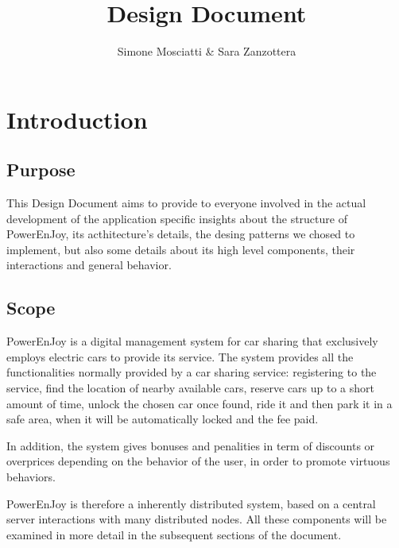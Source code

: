 \documentclass[11pt]{article} %
\title{Design Document}
\author{Simone Mosciatti \& Sara Zanzottera}
\newcommand{\pe}{PowerEnJoy }
\newcommand{\pecomma}{PowerEnJoy, }
\begin{document}
\maketitle
\newpage
\tableofcontents
\newpage


\section{Introduction}

\subsection{Purpose}

This Design Document aims to provide to everyone involved in the actual development of the application specific insights about the structure of \pecomma its acthitecture's details, the desing patterns we chosed to implement, but also some details about its high level components, their interactions and general behavior.

\subsection{Scope}

\pe is a digital management system for car sharing that exclusively employs electric cars to provide its service. The system provides all the functionalities normally provided by a car sharing service: registering to the service, find the location of nearby available cars, reserve cars up to a short amount of time, unlock the chosen car once found, ride it and then park it in a safe area, when it will be automatically locked and the fee paid.

In addition, the system gives bonuses and penalities in term of discounts or overprices depending on the behavior of the user, in order to promote virtuous behaviors.

\pe is therefore a inherently distributed system, based on a central server interactions with many distributed nodes. All these components will be examined in more detail in the subsequent sections of the document.
\end{document}
